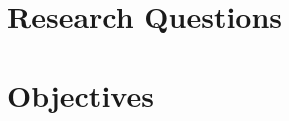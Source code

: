 \section{Research Questions}
\label{sec:intro:research-questions}

\section{Objectives}
\label{sec:intro:objectives}

